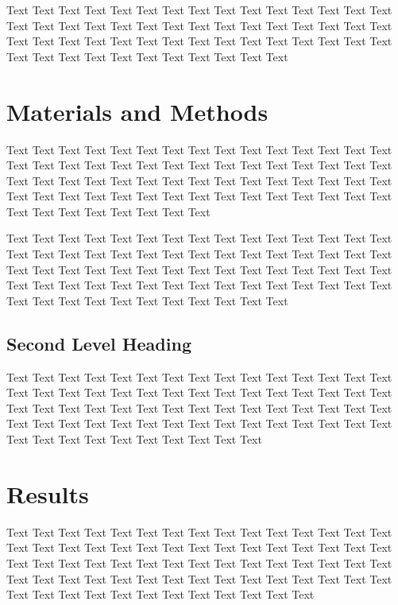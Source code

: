 \documentclass[oupdraft]{sysbio}
\begin{document}
Text Text Text Text Text Text Text Text Text Text Text Text Text Text Text Text Text Text Text Text Text Text Text Text Text Text Text Text Text Text Text Text Text Text Text Text Text Text Text Text Text Text Text Text Text Text Text Text Text Text Text Text Text Text Text Text
\bigskip
\section{Materials and Methods}
\label{sec2}


Text Text Text Text Text Text Text Text Text Text Text Text Text Text Text Text Text Text Text Text Text Text Text Text Text Text Text Text Text Text Text Text Text Text Text Text Text Text Text Text Text Text Text Text Text Text Text Text Text Text Text Text Text Text Text Text Text Text Text Text Text Text Text Text Text Text Text Text \citet{Author220XX}

Text Text Text Text Text Text Text Text Text Text Text Text Text Text Text Text Text Text Text Text Text Text Text Text Text Text Text Text Text Text Text Text Text Text Text Text Text Text Text Text Text Text Text Text Text Text Text Text Text Text Text Text Text Text Text Text Text Text Text Text Text Text Text Text Text Text Text Text Text Text Text

\subsection{Second Level Heading}

Text Text Text Text Text Text Text Text Text Text Text Text Text Text Text Text Text Text Text Text Text Text Text Text Text Text Text Text Text Text Text Text Text Text Text Text Text Text Text Text Text Text Text Text Text Text Text Text Text Text Text Text Text Text Text Text Text Text Text Text Text Text Text Text Text Text Text Text Text Text
\bigskip
\section{Results}
\label{sec3}

Text Text Text Text Text Text Text Text Text Text Text Text Text Text Text Text Text Text Text Text Text Text Text Text Text Text Text Text Text Text Text Text Text Text Text Text Text Text Text Text Text Text Text Text Text Text Text Text Text Text Text Text Text Text Text Text Text Text Text Text Text Text Text Text Text Text Text Text Text Text Text Text
\end{document}
